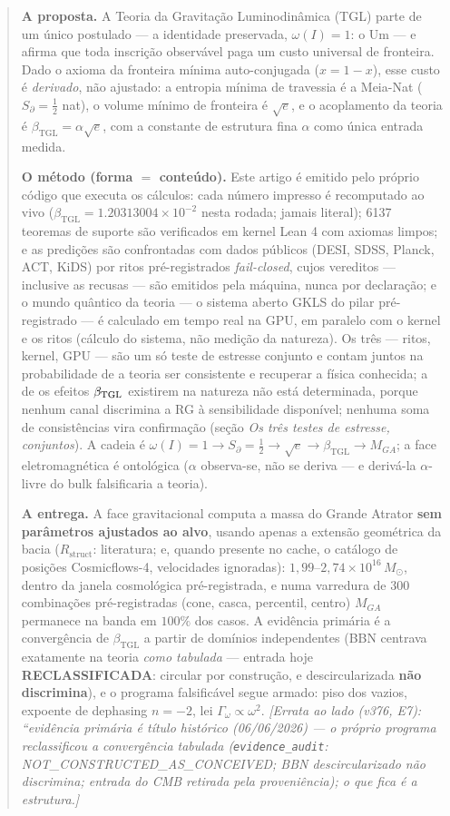 \documentclass[11pt]{article}
\newcommand{\bTGL}{\beta_{\mathrm{TGL}}}\newcommand{\Msun}{M_{\odot}}\newcommand{\TGL}{\mathrm{TGL}}
\theoremstyle{definition}\newtheorem{deriv}{Derivação}
\begin{document}
\begin{abstract}

\textbf{A proposta.} A Teoria da Gravitação Luminodinâmica (TGL) parte de um único postulado --- a identidade preservada, $\omega(I)=1$: o Um --- e afirma que toda inscrição observável paga um custo universal de fronteira. Dado o axioma da fronteira mínima auto-conjugada ($x=1-x$), esse custo é \emph{derivado}, não ajustado: a entropia mínima de travessia é a Meia-Nat ($S_\partial=\tfrac12$ nat), o volume mínimo de fronteira é $\sqrt e$, e o acoplamento da teoria é $\bTGL=\alpha\sqrt e$, com a constante de estrutura fina $\alpha$ como única entrada medida.

\textbf{O método (forma $=$ conteúdo).} Este artigo é emitido pelo próprio código que executa os cálculos: cada número impresso é recomputado ao vivo ($\bTGL=1.20313004\times10^{-2}$ nesta rodada; jamais literal); 6137 teoremas de suporte são verificados em kernel Lean 4 com axiomas limpos; e as predições são confrontadas com dados públicos (DESI, SDSS, Planck, ACT, KiDS) por ritos pré-registrados \emph{fail-closed}, cujos vereditos --- inclusive as recusas --- são emitidos pela máquina, nunca por declaração; e o mundo quântico da teoria --- o sistema aberto GKLS do pilar pré-registrado --- é calculado em tempo real na GPU, em paralelo com o kernel e os ritos (cálculo do sistema, não medição da natureza). Os três --- ritos, kernel, GPU --- são um só teste de estresse conjunto e contam juntos na probabilidade de a teoria ser consistente e recuperar a física conhecida; a de os efeitos $\beta_{\rm TGL}$ existirem na natureza não está determinada, porque nenhum canal discrimina a RG à sensibilidade disponível; nenhuma soma de consistências vira confirmação (seção \emph{Os três testes de estresse, conjuntos}). A cadeia é $\omega(I)=1\to S_\partial=\tfrac12\to\sqrt e\to\bTGL\to M_{GA}$; a face eletromagnética é ontológica ($\alpha$ observa-se, não se deriva --- e derivá-la $\alpha$-livre do bulk falsificaria a teoria).

\textbf{A entrega.} A face gravitacional computa a massa do Grande Atrator \textbf{sem parâmetros ajustados ao alvo}, usando apenas a extensão geométrica da bacia ($R_{\mathrm{struct}}$: literatura; e, quando presente no cache, o catálogo de posições Cosmicflows-4, velocidades ignoradas): $1{,}99$--$2{,}74\times10^{16}\,\Msun$, dentro da janela cosmológica pré-registrada, e numa varredura de $300$ combinações pré-registradas (cone, casca, percentil, centro) $M_{GA}$ permanece na banda em $100\%$ dos casos. A evidência primária é a convergência de $\bTGL$ a partir de domínios independentes (BBN centrava exatamente na teoria \emph{como tabulada} --- entrada hoje \textbf{RECLASSIFICADA}: circular por construção, e descircularizada \textbf{não discrimina}), e o programa falsificável segue armado: piso dos vazios, expoente de dephasing $n=-2$, lei $\Gamma_\omega\propto\omega^2$. \emph{[Errata ao lado (v376, E7): ``evidência primária é título histórico (06/06/2026) --- o próprio programa reclassificou a convergência tabulada (\texttt{evidence\_audit}: NOT\_CONSTRUCTED\_AS\_CONCEIVED; BBN descircularizado não discrimina; entrada do CMB retirada pela proveniência); o que fica é a estrutura.]}


\end{abstract}
\end{document}
